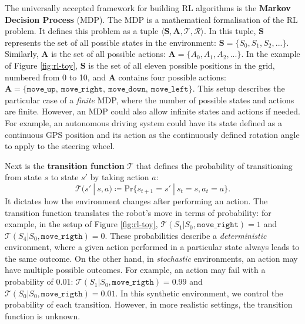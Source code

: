 The universally accepted framework for building RL algorithms is the \textbf{Markov Decision Process} (MDP). The MDP is a mathematical formalisation of the RL problem. It defines this problem as a tuple $\langle\mathbf{S},\mathbf{A},\mathcal{T},\mathcal{R}\rangle$. In this tuple, $\mathbf{S}$ represents the set of all possible states in the environment: $\mathbf{S}=\{S_0,S_1,S_2,...\}$. Similarly, $\mathbf{A}$ is the set of all possible actions: $\mathbf{A}=\{A_0,A_1,A_2,...\}$. In the example of Figure \ref{fig:rl-toy}, $\mathbf{S}$ is the set of all eleven possible positions in the grid, numbered from 0 to 10, and $\mathbf{A}$ contains four possible actions: $\mathbf{A}=\{\mathtt{move\_up},\allowbreak\ \mathtt{move\_right},\allowbreak\ \mathtt{move\_down},\allowbreak\ \mathtt{move\_left}\}$. This setup describes the particular case of a \textit{finite} MDP, where the number of possible states and actions are finite. However, an MDP could also allow infinite states and actions if needed. For example, an autonomous driving system could have its state defined as a continuous GPS position and its action as the continuously defined rotation angle to apply to the steering wheel. 

Next is the \textbf{transition function} $\mathcal{T}$ that defines the probability of transitioning from state $s$ to state $s'$ by taking action $a$:
\begin{equation}\label{eq:TransitionFunc}
    \mathcal{T}(s'\ |\ s,a)\coloneqq \text{Pr}\{s_{t+1}=s'\ |\ s_t=s,a_t=a\}.
\end{equation}
It dictates how the environment changes after performing an action. The transition function translates the robot's move in terms of probability: for example, in the setup of Figure \ref{fig:rl-toy}, $\mathcal{T}(S_1|S_0,\mathtt{move\_right})=1$ and $\mathcal{T}(S_4|S_0,\mathtt{move\_rigth})=0$. These probabilities describe a \textit{deterministic} environment, where a given action performed in a particular state always leads to the same outcome. On the other hand, in \textit{stochastic} environments, an action may have multiple possible outcomes. For example, an action may fail with a probability of 0.01: $\mathcal{T}(S_1|S_0,\mathtt{move\_rigth})=0.99$ and $\mathcal{T}(S_0|S_0,\mathtt{move\_rigth})=0.01$. In this synthetic environment, we control the probability of each transition. However, in more realistic settings, the transition function is unknown.

